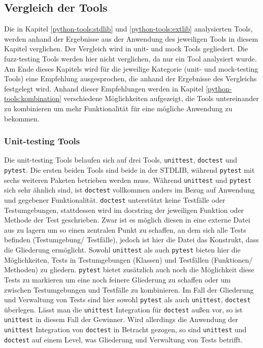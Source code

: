 \subsection{Vergleich der Tools}\label{python-tools:vergleich}

Die in Kapitel \ref{python-tools:stdlib} und \ref{python-tools:extlib}
analysierten Tools, werden anhand der Ergebnisse aus der Anwendung des
jeweiligen Tools in diesem Kapitel verglichen. Der Vergleich wird in unit- und
\gls{mock} Tools gegliedert. Die \gls{fuzz}-testing Tools werden hier
nicht verglichen, da nur ein Tool analysiert wurde. Am Ende dieses Kapitels 
wird für die jeweilige Kategorie (unit- und mock-testing Tools) eine Empfehlung 
ausgesprochen, die anhand der Ergebnisse des Vergleichs festgelegt wird. Anhand 
dieser Empfehlungen werden in Kapitel \ref{python-tools:kombination} 
verschiedene Möglichkeiten aufgezeigt, die Tools untereinander zu kombinieren 
um mehr Funktionalität für eine mögliche Anwendung zu bekommen.

\subsubsection{Unit-testing Tools}\label{python-tools:vergleich:unit}
Die unit-testing Tools belaufen sich auf drei Tools, \lstinline{unittest},
\lstinline{doctest} und \lstinline{pytest}. Die ersten beiden Tools sind beide
in der STDLIB, während \lstinline{pytest} mit sechs weiteren Paketen betrieben
werden muss. Während \lstinline{unittest} und \lstinline{pytest} sich sehr
ähnlich sind, ist \lstinline{doctest} vollkommen anders im Bezug auf Anwendung
und gegebener Funktionalität. \lstinline{doctest} unterstützt keine Testfälle
oder Testumgebungen, stattdessen wird im \gls{docstring} der jeweiligen
Funktion oder Methode der Test geschrieben. Zwar ist es möglich diesen in eine
externe Datei aus zu lagern um so einen zentralen Punkt zu schaffen, an dem sich
alle Tests befinden (Testumgebung/ Testfälle), jedoch ist hier die Datei das
Konstrukt, dass die Gliederung ermöglicht. Sowohl \lstinline{unittest} als auch
\lstinline{pytest} bieten hier die Möglichkeiten, Tests in Testumgebungen
(Klassen) und Testfällen (Funktionen/ Methoden) zu gliedern. \lstinline{pytest}
bietet zusätzlich auch noch die Möglichkeit diese Tests zu markieren um eine
noch feinere Gliederung zu schaffen oder um zwischen Testumgebungen und 
Testfälle zu kombinieren. Im Fall der Gliederung und Verwaltung von Tests sind 
hier sowohl \lstinline{pytest} als auch \lstinline{unittest}, 
\lstinline{doctest} überlegen. Lässt man die \lstinline{unittest} Integration 
für \lstinline{doctest} außen vor, so ist \lstinline{unittest} in diesem Fall 
der Gewinner. Wird allerdings die Anwendung der \lstinline{unittest} 
Integration von \lstinline{doctest} in Betracht gezogen, so sind 
\lstinline{unittest} und \lstinline{doctest} auf einem Level, was Gliederung 
und Verwaltung von Tests betrifft.

